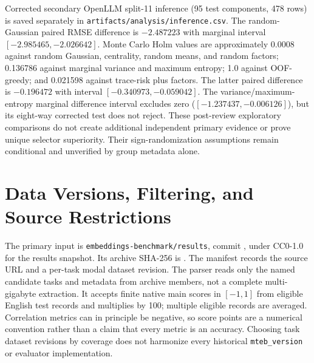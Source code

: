 \documentclass{article}
\begin{document}
\begin{table}[ht]
\caption{Validation adequacy decisions and held-out point errors at the selected budgets. \textbf{The final column is post-hoc test-curve description only}: it is not validation, not the frozen deployed policy, and not evidence to choose a budget. ``None'' means no evaluated $k<p$ qualifies, not that every possible policy fails. Tolerances are illustrative and fixed at 2 full-suite / 3 unseen score points.}
\label{tab:adequacy}
\centering

\end{table}

Corrected secondary OpenLLM split-11 inference (95 test components, 478 rows) is saved separately in \texttt{artifacts/analysis/inference.csv}. The random-Gaussian paired RMSE difference is $-2.487223$ with marginal interval $[-2.985465,-2.026642]$. Monte Carlo Holm values are approximately 0.0008 against random Gaussian, centrality, random means, and random factors; 0.136786 against marginal variance and maximum entropy; 1.0 against OOF-greedy; and 0.021598 against trace-risk plus factors. The latter paired difference is $-0.196472$ with interval $[-0.340973,-0.059042]$. The variance/maximum-entropy marginal difference interval excludes zero ($[-1.237437,-0.006126]$), but its eight-way corrected test does not reject. These post-review exploratory comparisons do not create additional independent primary evidence or prove unique selector superiority. Their sign-randomization assumptions remain conditional and unverified by group metadata alone.

\clearpage
\section{Data Versions, Filtering, and Source Restrictions}
\label{app:data}
The primary input is \texttt{embeddings-benchmark/results}, commit
\texttt{}, under CC0-1.0 for the results snapshot. Its archive SHA-256 is
\texttt{}.
The manifest records the source URL and a per-task modal dataset revision. The parser reads only the named candidate tasks and metadata from archive members, not a complete multi-gigabyte extraction. It accepts finite native main scores in $[-1,1]$ from eligible English test records and multiplies by 100; multiple eligible records are averaged. Correlation metrics can in principle be negative, so score points are a numerical convention rather than a claim that every metric is an accuracy. Choosing task dataset revisions by coverage does not harmonize every historical \texttt{mteb\_version} or evaluator implementation.
\end{document}
